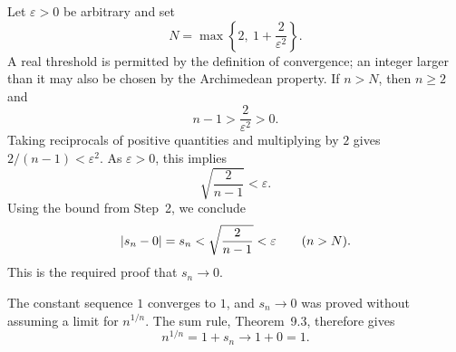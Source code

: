 Let $\varepsilon>0$ be arbitrary and set
\[
 N=\max\left\{2,\ 1+\frac2{\varepsilon^2}\right\}.
\]
A real threshold is permitted by the definition of convergence;
an integer larger than it may also be chosen by the Archimedean
property. If $n>N$, then $n\ge2$ and
\[
 n-1>\frac2{\varepsilon^2}>0.
\]
Taking reciprocals of positive quantities and multiplying by $2$
gives $2/(n-1)<\varepsilon^2$. As $\varepsilon>0$, this implies
\[
 \sqrt{\frac2{n-1}}<\varepsilon.
\]
Using the bound from Step~2, we conclude
\[
 \left|s_n-0\right|=s_n<\sqrt{\frac2{n-1}}<\varepsilon
 \qquad(n>N).
\]
This is the required proof that $s_n\to0$.

The constant sequence $1$ converges to $1$, and $s_n\to0$ was
proved without assuming a limit for $n^{1/n}$.
The sum rule, Theorem~9.3, therefore gives
\[
 n^{1/n}=1+s_n\longrightarrow1+0=1.
\]

